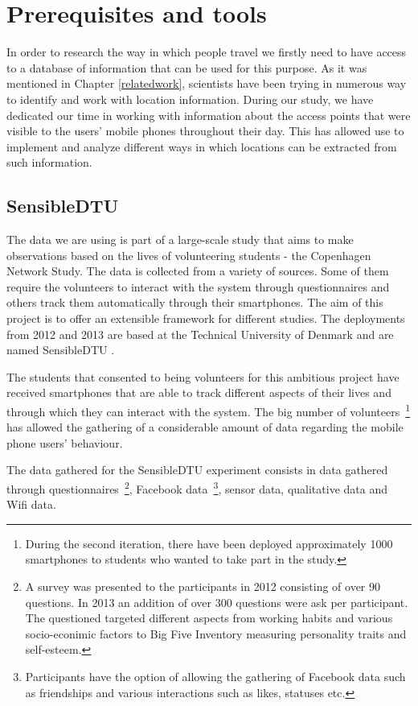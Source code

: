 \chapter{Prerequisites and tools}
In order to research the way in which people travel we firstly need to have
access to a database of information that can be used for this purpose. As it was
mentioned in Chapter \ref{relatedwork}, scientists have been trying in numerous
way to identify and work with location information. During our study, we have
dedicated our time in working with information about the access points that were
visible to the users' mobile phones throughout their day. This has allowed use
to implement and analyze different ways in which locations can be extracted from
such information.

\section{SensibleDTU}
The data we are using is part of a large-scale study that aims to make
observations based on the lives of volunteering students - the Copenhagen
Network Study. The data is collected from a variety of sources. Some of them
require the volunteers to interact with the system through questionnaires and
others track them automatically through their smartphones. The aim of this
project is to offer an extensible framework for different studies. The
deployments from 2012 and 2013 are based at the Technical University of Denmark
and are named SensibleDTU \cite{Stopczynski14m}.

The students that consented to being volunteers for this ambitious project have
received smartphones that are able to track different aspects of their lives and
through which they can interact with the system. The big number of
volunteers~\footnote{During the second iteration, there have been deployed
approximately 1000 smartphones to students who wanted to take part in the study.}
has allowed the gathering of a considerable amount of data regarding the mobile
phone users' behaviour.

The data gathered for the SensibleDTU experiment consists in data gathered
through questionnaires~\footnote{A survey was presented to the participants in
2012 consisting of over 90 questions. In 2013 an addition of over 300 questions
were ask per participant. The questioned targeted different aspects from working
habits and various socio-econimic factors to Big Five Inventory measuring
personality traits \cite{John99} and self-esteem.}, Facebook
data~\footnote{Participants have the option of allowing the gathering of
Facebook data such as friendships and various interactions such as likes,
statuses etc.}, sensor data, qualitative data and Wifi data.

